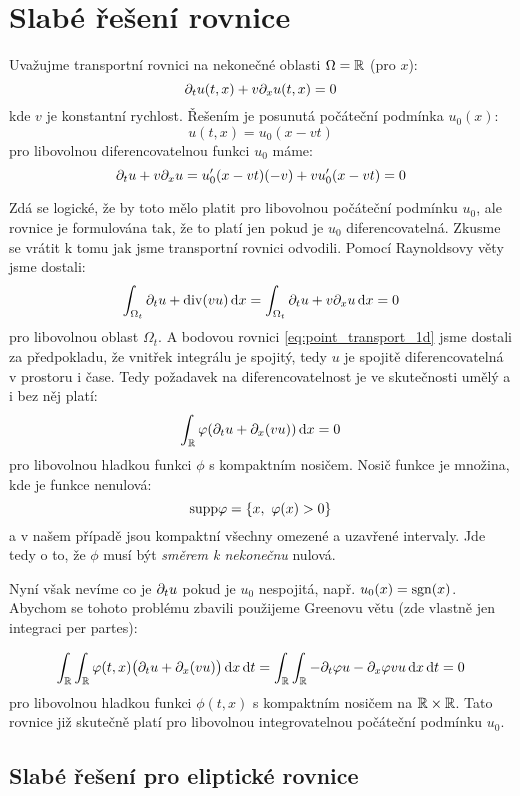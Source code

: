 \section{Slabé řešení rovnice}
Uvažujme transportní rovnici na nekonečné oblasti $\Omega = {\mathbb R}$ (pro $x$):
\begin{equation}
    \label{eq:point_transport_1d}
    \partial_t u(t,x) + v\partial_x u(t,x) =0 
\end{equation}
kde $v$ je konstantní rychlost. Řešením je posunutá počáteční podmínka $u_0(x)$:
\[
    u(t,x) = u_0(x-vt)
\]
pro libovolnou diferencovatelnou funkci $u_0$ máme:
\[
    \partial_t u + v\partial_x u=u_0'(x-vt)(-v) + vu_0'(x-vt)=0
\]

Zdá se logické, že by toto mělo platit pro libovolnou počáteční podmínku $u_0$, ale rovnice je formulována tak, že 
to platí jen pokud je $u_0$ diferencovatelná. Zkusme se vrátit k tomu jak jsme transportní rovnici odvodili. Pomocí Raynoldsovy věty jsme dostali:
\[
    \int_{\Omega_t} \partial_t u + \operatorname{div}(v u) \,{\rm d} x= \int_{\Omega_t} \partial_t u + v\partial_x u \,{\rm d} x= 0
\]
pro libovolnou oblast $\Omega_t$. A bodovou rovnici \eqref{eq:point_transport_1d} jsme dostali za předpokladu, že vnitřek integrálu je spojitý, 
tedy $u$ je spojitě diferencovatelná v prostoru i čase. Tedy požadavek na diferencovatelnost je ve skutečnosti umělý a i bez něj platí:
\[
    \int_{\mathbb R} \varphi(\partial_t u + \partial_x(vu)) \,{\rm d} x = 0
\]
pro libovolnou hladkou funkci $\phi$ s kompaktním nosičem. Nosič funkce je množina, kde je funkce nenulová:
\[
    {\rm supp} \varphi = \{ x,\ \varphi(x) > 0\}
\]
a v našem případě jsou kompaktní všechny omezené a uzavřené intervaly. Jde tedy o to, že $\phi$ musí být \emph{směrem k nekonečnu} nulová.

Nyní však nevíme co je $\partial_t u$ pokud je $u_0$ nespojitá, např. $u_0(x)=\operatorname{sgn}(x)$. Abychom se tohoto problému zbavili použijeme Greenovu větu 
(zde vlastně jen integraci per partes):

\[
    \int_{\mathbb R} \int_{\mathbb R} \varphi(t,x)\big(\partial_t u + \partial_x(vu)\big) \,{\rm d} x \,{\rm d} t= 
    \int_{\mathbb R} \int_{\mathbb R} -\partial_t \varphi u - \partial_x \varphi vu \,{\rm d} x \,{\rm d} t = 0
\]
pro libovolnou hladkou funkci $\phi(t,x)$ s kompaktním nosičem na ${\mathbb R} \times {\mathbb R}$.
Tato rovnice již skutečně platí pro libovolnou integrovatelnou počáteční podmínku $u_0$.


\subsection{Slabé řešení pro eliptické rovnice}
\label{sec:weak_sol_elliptic_eq}

